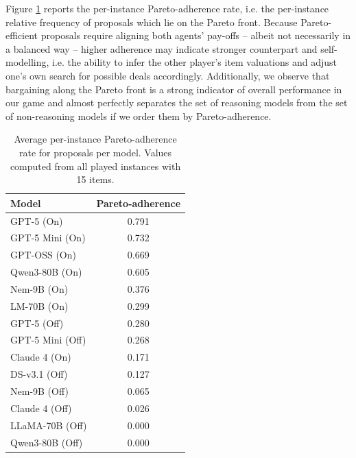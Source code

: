 \documentclass[../main.tex]{subfiles}
\begin{document}
Figure \ref{tab:air-balloon-pareto-adherence} reports the per-instance Pareto-adherence rate, i.e. the per-instance relative frequency of proposals which lie on the Pareto front. Because Pareto-efficient proposals require aligning both agents' pay-offs -- albeit not necessarily in a balanced way -- higher adherence may indicate stronger counterpart and self-modelling, i.e. the ability to infer the other player's item valuations and adjust one's own search for possible deals accordingly. Additionally, we observe that bargaining along the Pareto front is a strong indicator of overall performance in our game and almost perfectly separates the set of reasoning models from the set of non-reasoning models if we order them by Pareto-adherence.
\begin{table}[ht]
\centering
\footnotesize
\setlength{\tabcolsep}{4pt}
\begin{tabular}{l c}
\hline
\textbf{Model} & \textbf{Pareto-adherence} \\
\hline
GPT-5 (On) & 0.791 \\
GPT-5 Mini (On) & 0.732 \\
GPT-OSS (On) & 0.669 \\
Qwen3-80B (On) & 0.605 \\
Nem-9B (On) & 0.376 \\
LM-70B (On) & 0.299 \\
GPT-5 (Off) & 0.280 \\
GPT-5 Mini (Off) & 0.268 \\
Claude 4 (On) & 0.171 \\
DS-v3.1 (Off) & 0.127 \\
Nem-9B (Off) & 0.065 \\
Claude 4 (Off) & 0.026 \\
LLaMA-70B (Off) & 0.000 \\
Qwen3-80B (Off) & 0.000 \\
\hline
\end{tabular}
\caption{Average per-instance Pareto-adherence rate for proposals per model. Values computed from all played instances with 15 items.}
\label{tab:air-balloon-pareto-adherence}
\end{table}
\end{document}
